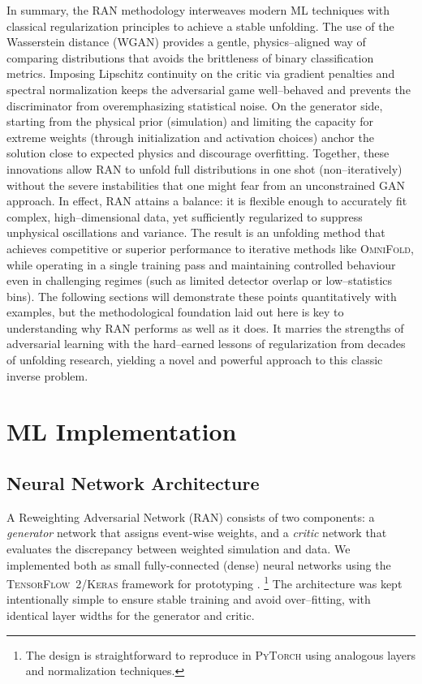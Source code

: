 {{    In summary, the RAN methodology interweaves modern ML techniques with classical regularization principles to achieve a stable unfolding.
    The use of the Wasserstein distance (WGAN) provides a gentle, physics--aligned way of comparing distributions that avoids the brittleness of binary classification metrics.
    Imposing Lipschitz continuity on the critic via gradient penalties and spectral normalization keeps the adversarial game well--behaved and prevents the discriminator from overemphasizing statistical noise.
    On the generator side, starting from the physical prior (simulation) and limiting the capacity for extreme weights (through initialization and activation choices) anchor the solution close to expected physics and discourage overfitting.
    Together, these innovations allow RAN to unfold full distributions in one shot (non--iteratively) without the severe instabilities that one might fear from an unconstrained GAN approach.
    In effect, RAN attains a balance: it is flexible enough to accurately fit complex, high--dimensional data, yet sufficiently regularized to suppress unphysical oscillations and variance.
    The result is an unfolding method that achieves competitive or superior performance to iterative methods like \textsc{OmniFold}, while operating in a single training pass and maintaining controlled behaviour even in challenging regimes (such as limited detector overlap or low--statistics bins).
    The following sections will demonstrate these points quantitatively with examples, but the methodological foundation laid out here is key to understanding why RAN performs as well as it does.
    It marries the strengths of adversarial learning with the hard--earned lessons of regularization from decades of unfolding research, yielding a novel and powerful approach to this classic inverse problem.
\section{ML Implementation}
    \subsection{Neural Network Architecture}
        A Reweighting Adversarial Network (RAN) consists of two components: a \emph{generator} network that assigns event-wise weights, and a \emph{critic} network that evaluates the discrepancy between weighted simulation and data.
        We implemented both as small fully-connected (dense) neural networks using the \textsc{TensorFlow~2/Keras} framework for prototyping .
        \footnote{The design is straightforward to reproduce in \textsc{PyTorch} using analogous layers and normalization techniques.}
        The architecture was kept intentionally simple to ensure stable training and avoid over--fitting, with identical layer widths for the generator and critic.

}}
